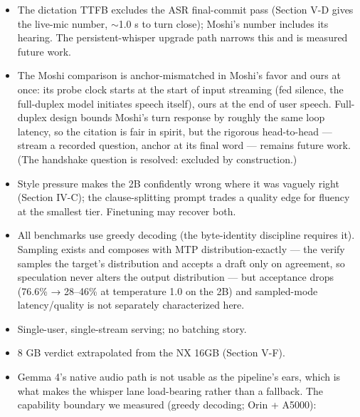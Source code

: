 \documentclass[journal]{IEEEtran}
\begin{document}
    \begin{itemize}
        \item The dictation TTFB excludes the ASR final-commit pass (Section V-D gives the live-mic number, $\sim$1.0 s to turn close); Moshi's number includes its hearing. The persistent-whisper upgrade path narrows this and is measured future work.
        \item The Moshi comparison is anchor-mismatched in Moshi's favor and ours at once: its probe clock starts at the start of input streaming (fed silence, the full-duplex model initiates speech itself), ours at the end of user speech. Full-duplex design bounds Moshi's turn response by roughly the same loop latency, so the citation is fair in spirit, but the rigorous head-to-head — stream a recorded question, anchor at its final word — remains future work. (The handshake question is resolved: excluded by construction.)
        \item Style pressure makes the 2B confidently wrong where it was vaguely right (Section IV-C); the clause-splitting prompt trades a quality edge for fluency at the smallest tier. Finetuning may recover both.
        \item All benchmarks use greedy decoding (the byte-identity discipline requires it). Sampling exists and composes with MTP distribution-exactly — the verify samples the target's distribution and accepts a draft only on agreement, so speculation never alters the output distribution — but acceptance drops (76.6\% → 28–46\% at temperature 1.0 on the 2B) and sampled-mode latency/quality is not separately characterized here.
        \item Single-user, single-stream serving; no batching story.
        \item 8 GB verdict extrapolated from the NX 16GB (Section V-F).
        \item Gemma 4's native audio path is not usable as the pipeline's ears, which is what makes the whisper lane load-bearing rather than a fallback. The capability boundary we measured (greedy decoding; Orin + A5000):
    \end{itemize}
\end{document}
